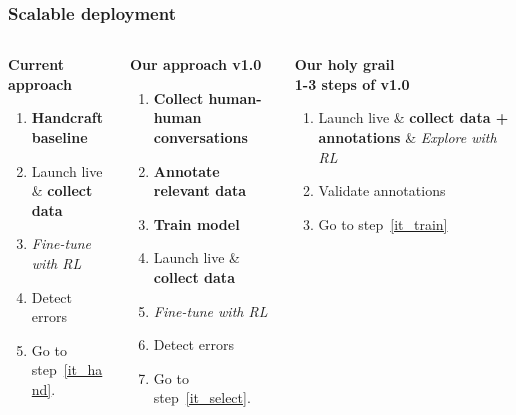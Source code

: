 \documentclass[10pt, compress,british,xcolor={svgnames,dvipsnames,x11names},trans]{beamer}
\begin{document}
\begin{frame}\frametitle{Scalable deployment}
\begin{columns}
\begin{column}{0.33\textwidth}
    {\bf Current approach } \\
    \begin{enumerate}
        \item\label{it_hand} {\bf \color{red} Handcraft baseline}
        \item Launch live \& {\bf collect data}
        \item {\it Fine-tune with RL}
        \item Detect errors
        \item Go to step~\ref{it_hand}.
    \end{enumerate}
\end{column}
\begin{column}{0.33\textwidth}
    {\bf Our approach v1.0 } \\
    \begin{enumerate}
        \item {\bf \color{darkgreen} Collect human-human conversations}
        \item\label{it_select} {\bf \color{darkgreen} Annotate relevant data}
        \item\label{it_train} {\bf \color{darkgreen} Train model}
        \item Launch live \& {\bf collect data}
        \item {\it Fine-tune with RL}
        \item Detect errors
        \item Go to step~\ref{it_select}.
    \end{enumerate}
\end{column}
\begin{column}{0.33\textwidth}
    {\bf Our holy grail } \\
    {\bf \color{darkgreen} 1-3 steps of v1.0} \\
    \begin{enumerate}
        \item Launch live \& {\bf collect data + annotations} \& {\it Explore with RL}
        \item Validate annotations
        \item Go to step~\ref{it_train}
    \end{enumerate}
\end{column}
\end{columns}
\end{frame}
\end{document}
